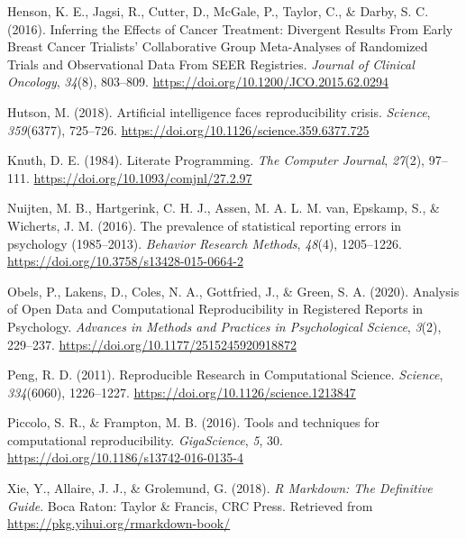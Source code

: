 \documentclass[
  english,
  ,man,floatsintext]{apa6}
\newlength{\cslhangindent}
\newenvironment{CSLReferences}[2] %
 {\begin{list}{}{%
  \setlength{\itemindent}{0pt}
  \setlength{\leftmargin}{0pt}
  \setlength{\parsep}{0pt}
  \ifodd #1
   \setlength{\leftmargin}{\cslhangindent}
   \setlength{\itemindent}{-1\cslhangindent}
  \fi
  \setlength{\itemsep}{#2\baselineskip}}}
 {\end{list}}
\begin{document}
\begin{CSLReferences}{1}{0}
Henson, K. E., Jagsi, R., Cutter, D., McGale, P., Taylor, C., \& Darby, S. C. (2016). Inferring the Effects of Cancer Treatment: Divergent Results From Early Breast Cancer Trialists' Collaborative Group Meta-Analyses of Randomized Trials and Observational Data From SEER Registries. \emph{Journal of Clinical Oncology}, \emph{34}(8), 803--809. \url{https://doi.org/10.1200/JCO.2015.62.0294}

Hutson, M. (2018). Artificial intelligence faces reproducibility crisis. \emph{Science}, \emph{359}(6377), 725--726. \url{https://doi.org/10.1126/science.359.6377.725}

Knuth, D. E. (1984). Literate Programming. \emph{The Computer Journal}, \emph{27}(2), 97--111. \url{https://doi.org/10.1093/comjnl/27.2.97}

Nuijten, M. B., Hartgerink, C. H. J., Assen, M. A. L. M. van, Epskamp, S., \& Wicherts, J. M. (2016). The prevalence of statistical reporting errors in psychology (1985--2013). \emph{Behavior Research Methods}, \emph{48}(4), 1205--1226. \url{https://doi.org/10.3758/s13428-015-0664-2}

Obels, P., Lakens, D., Coles, N. A., Gottfried, J., \& Green, S. A. (2020). Analysis of Open Data and Computational Reproducibility in Registered Reports in Psychology. \emph{Advances in Methods and Practices in Psychological Science}, \emph{3}(2), 229--237. \url{https://doi.org/10.1177/2515245920918872}

Peng, R. D. (2011). Reproducible Research in Computational Science. \emph{Science}, \emph{334}(6060), 1226--1227. \url{https://doi.org/10.1126/science.1213847}

Piccolo, S. R., \& Frampton, M. B. (2016). Tools and techniques for computational reproducibility. \emph{GigaScience}, \emph{5}, 30. \url{https://doi.org/10.1186/s13742-016-0135-4}

Xie, Y., Allaire, J. J., \& Grolemund, G. (2018). \emph{R Markdown: The Definitive Guide}. Boca Raton: Taylor \& Francis, CRC Press. Retrieved from \url{https://pkg.yihui.org/rmarkdown-book/}

\end{CSLReferences}
\end{document}
